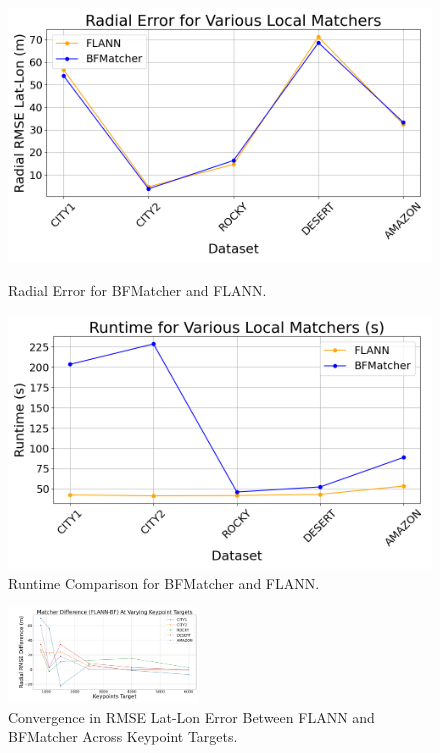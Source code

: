 \begin{figure}[H]
    \centering
    \begin{minipage}{0.45\textwidth}
        \centering
        \includegraphics[width=\textwidth]{./Chapter 4/testresults/rmse_flann_bf.png}
        \caption{Radial Error for BFMatcher and FLANN.}
        \label{fig:rmse_flann_bf}
    \end{minipage}\hfill
    \begin{minipage}{0.45\textwidth}
        \centering
        \includegraphics[width=\textwidth]{./Chapter 4/testresults/runtime_flann_bf.png}
        \caption{Runtime Comparison for BFMatcher and FLANN.}
        \label{fig:runtime_flann_bf}
    \end{minipage}
\end{figure}

\begin{figure}[H]
    \centering
    \includegraphics[width=0.45\textwidth]{./Chapter 4/Divergence.png}
    \caption{Convergence in RMSE Lat-Lon Error Between FLANN and BFMatcher Across Keypoint Targets.}
    \label{fig:FLANN BF Matcher Keypoint Convergence} 
\end{figure}

